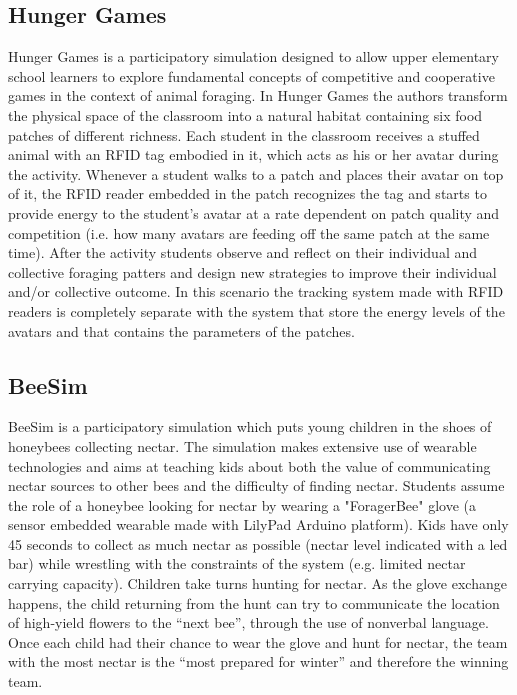 \subsection{Hunger Games}
Hunger Games \cite{gnoli:hunger_games} is a participatory simulation designed to allow upper elementary school learners to explore fundamental concepts of competitive and cooperative games in the context of animal foraging. In Hunger Games the authors transform the physical space of the classroom into a natural habitat containing six food patches of different richness. Each student in the classroom receives a stuffed animal with an RFID tag embodied in it, which acts as his or her avatar during the activity. Whenever a student walks to a patch and places their avatar on top of it, the RFID reader embedded in the patch recognizes the tag and starts to provide energy to the student's avatar at a rate dependent on patch quality and competition (i.e. how many avatars are feeding off the same patch at the same time). After the activity students observe and reflect on their individual and collective foraging patters and design new strategies to improve their individual and/or collective outcome. In this scenario the tracking system made with RFID readers is completely separate with the system that store the energy levels of the avatars and that contains the parameters of the patches.

\subsection{BeeSim}
BeeSim \cite{peppler:beesim} is a participatory simulation which puts young children in the shoes of honeybees collecting nectar. The simulation makes extensive use of wearable technologies and aims at teaching kids about both the value of communicating nectar sources to other bees and the difficulty of finding nectar. Students assume the role of a honeybee looking for nectar by wearing a "ForagerBee" glove (a sensor embedded wearable made with LilyPad Arduino platform). Kids have only 45 seconds to collect as much nectar as possible (nectar level indicated with a led bar) while wrestling with the constraints of the system (e.g. limited nectar carrying capacity). Children take turns hunting for nectar. As the glove exchange happens, the child returning from the hunt can try to communicate the location of high-yield flowers to the “next bee”, through the use of nonverbal language. Once each child had their chance to wear the glove and hunt for nectar, the team with the most nectar is the “most prepared for winter” and therefore the winning team.

